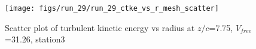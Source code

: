 \begin{figure}[H]
\centering
\texttt{[image: figs/run\_29/run\_29\_ctke\_vs\_r\_mesh\_scatter]}
\caption{Scatter plot of turbulent kinetic energy vs radius at $z/c$=7.75, $V_{free}$=31.26, station3}
\label{fig:run_29_ctke_vs_r_mesh_scatter}
\end{figure}


